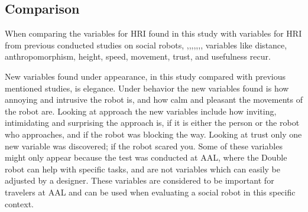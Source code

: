 \subsection{Comparison}
When comparing the variables for HRI found in this study with variables for HRI from previous conducted studies on social robots, \cite{PDF:ExploringInfluencingVariable},\cite{PDF:SharingALifeHarvey},\cite{PDF:HowMayIServeYou},\cite{PDF:CloseButNotStuck},\cite{PDF:TheImpactOfTraveler},\cite{PDF:HumanRobotEmodiedInteraction},\cite{PDF:RecommendationEffects}, variables like distance, anthropomorphism, height, speed, movement, trust, and usefulness recur. 

New variables found under appearance, in this study compared with previous mentioned studies, is elegance. Under behavior the new variables found is how annoying and intrusive the robot is, and how calm and pleasant the movements of the robot are. Looking at approach the new variables include how inviting, intimidating and surprising the approach is, if it is either the person or the robot who approaches, and if the robot was blocking the way. Looking at trust only one new variable was discovered; if the robot scared you. Some of these variables might only appear because the test was conducted at AAL, where the Double robot can help with specific tasks, and are not variables which can easily be adjusted by a designer. These variables are considered to be important for travelers at AAL and can be used when evaluating a social robot in this specific context. 